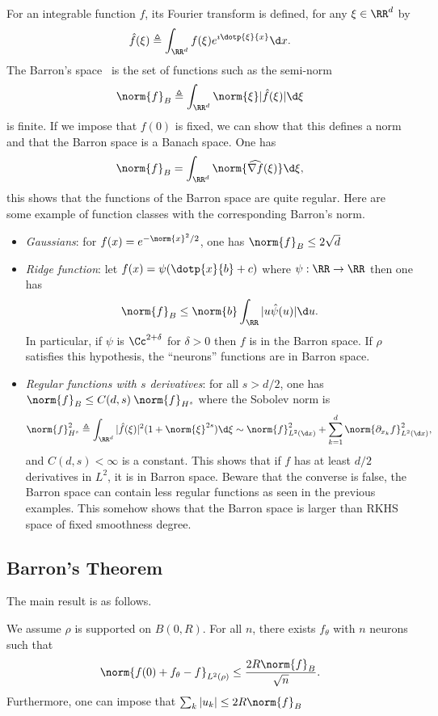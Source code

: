 For an integrable function $f$, its Fourier transform is defined, for any $\xi \in \RR^d $ by
$$
    \hat{f}(\xi) \triangleq \int_{\RR^d}f(\xi) e^{\imath \dotp{\xi}{x} } \d x.
$$
The Barron's space~\cite{barron1993universal} is the set of functions such as the semi-norm
$$
	\norm{f}_B \triangleq  \int_{\RR^d}\norm{\xi} | \hat{f}(\xi) | \d\xi 
$$ 
is finite. If we impose that $f(0)$ is fixed, we can show that this defines a norm and that the Barron space is a Banach space.
One has
$$
	\norm{f}_B = \int_{\RR^d} \norm{\widehat{\nabla f}(\xi)} \d\xi, 
$$ 
this shows that the functions of the Barron space are quite regular.
%
Here are some example of function classes with the corresponding Barron's norm.
\begin{itemize}
    \item \emph{Gaussians}: for $f(x) = e^{- \norm{x}^2/2}$, one has $\norm{f}_B \leq 2 \sqrt{d}$
    \item \emph{Ridge function}: let $ f(x) = \psi (\dotp{x}{b} + c) $ where $\psi: \RR \rightarrow \RR$ then one has
    $$
    	\norm{f}_B \leq \norm{b} \int_{\RR} |u \hat{\psi}(u) | \d u. 
	$$ 
    In particular,  if $\psi$ is $\Cc^{2 + \delta}$ for $\delta> 0 $ then $f$ is in the Barron space. If $\rho$ satisfies this hypothesis, the ``neurons'' functions are in Barron space.
    \item \emph{Regular functions with $ s $ derivatives}: for all $ s>d/2 $, one has $\norm{f}_B \leq C(d,s) \: \norm{f}_{H^s}$ where 
    the Sobolev norm is
    $$
    	\norm{f}^2_{H^s} \triangleq \int_{\RR^d}| \hat{f}(\xi) |^2 (1+ \norm{\xi}^{2s}) \d\xi 
		\sim \norm{f}_{L^2(\d x)}^2 + \sum_{k=1}^d \norm{\partial_{x_k} f}_{L^2(\d x)}^2, 
	$$ 
	and $ C(d,s) <\infty$ is a constant. This shows that if $ f $ has at least $ d / 2 $ derivatives in $L^2$, it is in Barron space. Beware that the converse is false, the Barron space can contain less regular functions as seen in the previous examples.
	This somehow shows that the Barron space is larger than RKHS space of fixed smoothness degree.
\end{itemize}


\subsection{Barron's Theorem}


The main result is as follows.

\begin{thm}
	We assume $\rho$ is supported on $B(0,R)$.
    For all $n$, there exists $f_\theta$ with $n$ neurons such that
    $$
        \norm{f(0) + f_\theta - f}_{L^2(\rho)} \leq \frac{2R \norm{f}_B}{\sqrt{n}}.
    $$
    Furthermore, one can impose that $\sum_k | u_k | \leq 2 R \norm{f}_B$
\end{thm}

